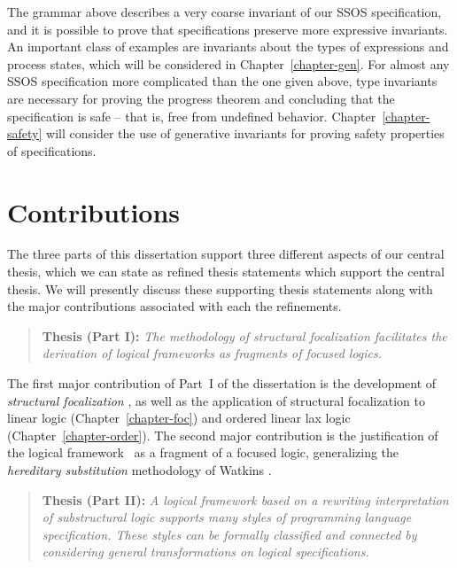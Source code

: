 The grammar above describes a very coarse invariant of our SSOS
specification, and it is possible to prove that specifications
preserve more expressive invariants. An important class of examples
are invariants about the types of expressions and process states,
which will be considered in Chapter~\ref{chapter-gen}.  For almost any
SSOS specification more complicated than the one given above, type
invariants are necessary for proving the progress theorem and
concluding that the specification is safe -- that is, free from
undefined behavior.  Chapter~\ref{chapter-safety} will consider the
use of generative invariants for proving safety properties of
specifications.

\section{Contributions}

The three parts of this dissertation support three different
aspects of our central thesis, which we can state as refined thesis
statements which support the central thesis. We will presently discuss
these supporting thesis statements along with the major contributions
associated with each the refinements.

\smallskip
\begin{quote} {\bf Thesis (Part I):} {\it The methodology of
    structural focalization facilitates the derivation of logical
    frameworks as fragments of focused logics.}
\end{quote}
\smallskip

\noindent
The first major contribution of Part~I of the dissertation is the
development of {\it structural focalization}
\cite{simmons11structural}, as well as 
the application of structural focalization
to linear logic (Chapter~\ref{chapter-foc}) and ordered linear lax
logic (Chapter~\ref{chapter-order}). The second major contribution is
the justification of the logical framework \sls~as a fragment of a
focused logic, generalizing the {\it hereditary substitution}
methodology of Watkins \cite{watkins02concurrent}.

\smallskip
\begin{quote} 
  {\bf Thesis (Part II):} {\it A logical framework based on a rewriting
  interpretation of substructural logic supports many styles of
  programming language specification. These styles can be formally
  classified and connected by considering general transformations on
  logical specifications.}
\end{quote} 
\smallskip

